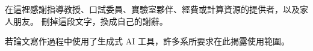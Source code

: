 
%

\begin{acknowledgement}

在這裡感謝指導教授、口試委員、實驗室夥伴、經費或計算資源的提供者，以及家人朋友。
刪掉這段文字，換成自己的謝辭。

若論文寫作過程中使用了生成式 AI 工具，許多系所要求在此揭露使用範圍。

\end{acknowledgement}
